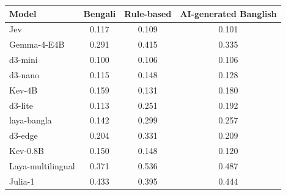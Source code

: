 \begin{tabular}{@{}lccc@{}}\toprule
Model & Bengali & Rule-based & AI-generated Banglish \\\midrule
Jev & 0.117 & 0.109 & 0.101 \\
Gemma-4-E4B & 0.291 & 0.415 & 0.335 \\
d3-mini & 0.100 & 0.106 & 0.106 \\
d3-nano & 0.115 & 0.148 & 0.128 \\
Kev-4B & 0.159 & 0.131 & 0.180 \\
d3-lite & 0.113 & 0.251 & 0.192 \\
laya-bangla & 0.142 & 0.299 & 0.257 \\
d3-edge & 0.204 & 0.331 & 0.209 \\
Kev-0.8B & 0.150 & 0.148 & 0.120 \\
Laya-multilingual & 0.371 & 0.536 & 0.487 \\
Julia-1 & 0.433 & 0.395 & 0.444 \\
\bottomrule\end{tabular}
